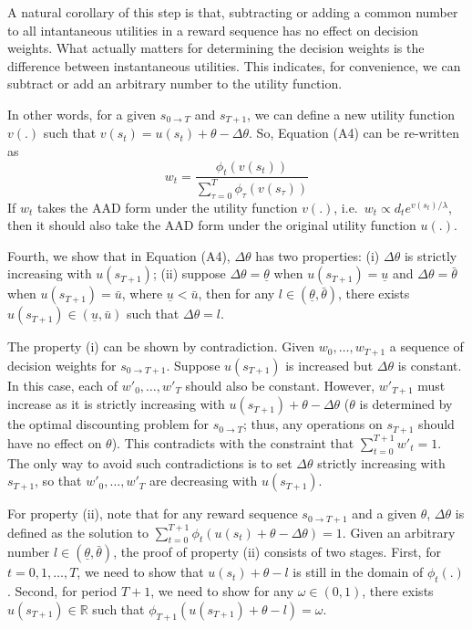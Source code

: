 \documentclass[
  12pt,
]{article}
\begin{document}
A natural corollary of this step is that, subtracting or adding a common
number to all intantaneous utilities in a reward sequence has no effect
on decision weights. What actually matters for determining the decision
weights is the difference between instantaneous utilities. This
indicates, for convenience, we can subtract or add an arbitrary number
to the utility function.

In other words, for a given \(s_{0\rightarrow T}\) and \(s_{T+1}\), we
can define a new utility function \(v(.)\) such that
\(v(s_t) = u(s_t) +\theta-\Delta \theta\). So, Equation (A4) can be
re-written as\[\tag{A5}
w_t = \frac{\phi_t(v(s_t))}{\sum_{\tau=0}^{T}\phi_\tau(v(s_\tau))}
\]If \(w_t\) takes the AAD form under the utility function \(v(.)\),
i.e.~\(w_t \propto d_t e^{v(s_t)/\lambda}\), then it should also take
the AAD form under the original utility function \(u(.)\).

Fourth, we show that in Equation (A4), \(\Delta \theta\) has two
properties: (i) \(\Delta \theta\) is strictly increasing with
\(u(s_{T+1})\); (ii) suppose \(\Delta \theta = \underline{\theta}\) when
\(u(s_{T+1})=\underline{u}\) and \(\Delta\theta=\bar{\theta}\) when
\(u(s_{T+1})=\bar{u}\), where \(\underline{u}<\bar{u}\), then for any
\(l \in(\underline{\theta},\bar{\theta})\), there exists
\(u(s_{T+1})\in(\underline{u},\bar{u})\) such that
\(\Delta \theta = l\).

The property (i) can be shown by contradiction. Given \(w_0,…,w_{T+1}\)
a sequence of decision weights for \(s_{0\rightarrow T+1}\). Suppose
\(u(s_{T+1})\) is increased but \(\Delta \theta\) is constant. In this
case, each of \(w'_0,…,w'_T\) should also be constant. However,
\(w'_{T+1}\) must increase as it is strictly increasing with
\(u(s_{T+1})+\theta-\Delta \theta\) (\(\theta\) is determined by the
optimal discounting problem for \(s_{0\rightarrow T}\); thus, any
operations on \(s_{T+1}\) should have no effect on \(\theta\)). This
contradicts with the constraint that \(\sum_{t=0}^{T+1} w'_t =1\). The
only way to avoid such contradictions is to set \(\Delta \theta\)
strictly increasing with \(s_{T+1}\), so that \(w'_0,…,w'_T\) are
decreasing with \(u(s_{T+1})\).

For property (ii), note that for any reward sequence
\(s_{0\rightarrow T+1}\) and a given \(\theta\), \(\Delta\theta\) is
defined as the solution to
\(\sum_{t=0}^{T+1} \phi_t(u(s_t)+\theta-\Delta\theta)=1\). Given an
arbitrary number \(l\in(\underline{\theta},\bar{\theta})\), the proof of
property (ii) consists of two stages. First, for \(t=0,1,…,T\), we need
to show that \(u(s_t)+\theta-l\) is still in the domain of
\(\phi_t(.)\). Second, for period \(T+1\), we need to show for any
\(\omega\in(0,1)\), there exists \(u(s_{T+1})\in \mathbb{R}\) such that
\(\phi_{T+1}(u(s_{T+1})+\theta-l)=\omega\).
\end{document}
